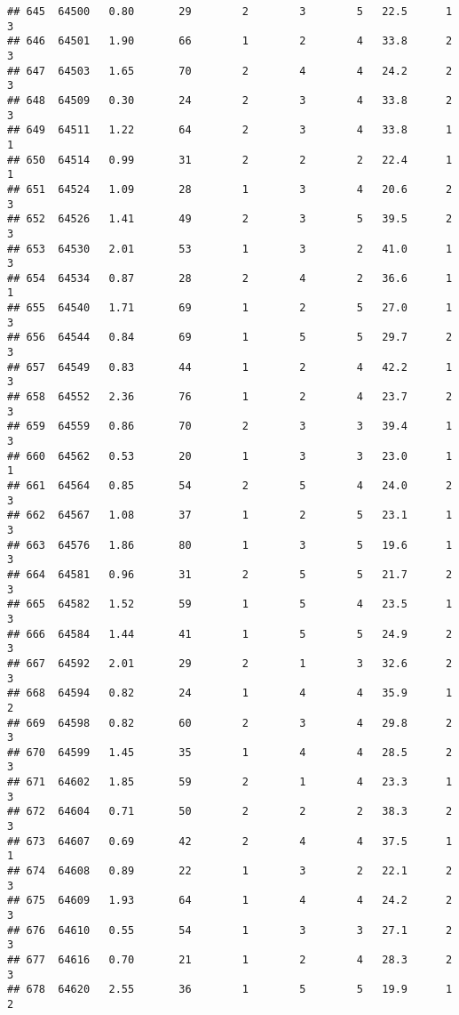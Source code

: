 \documentclass[
]{article}
\begin{document}
\begin{verbatim}
## 645  64500   0.80       29        2        3        5   22.5      1      3
## 646  64501   1.90       66        1        2        4   33.8      2      3
## 647  64503   1.65       70        2        4        4   24.2      2      3
## 648  64509   0.30       24        2        3        4   33.8      2      3
## 649  64511   1.22       64        2        3        4   33.8      1      1
## 650  64514   0.99       31        2        2        2   22.4      1      1
## 651  64524   1.09       28        1        3        4   20.6      2      3
## 652  64526   1.41       49        2        3        5   39.5      2      3
## 653  64530   2.01       53        1        3        2   41.0      1      3
## 654  64534   0.87       28        2        4        2   36.6      1      1
## 655  64540   1.71       69        1        2        5   27.0      1      3
## 656  64544   0.84       69        1        5        5   29.7      2      3
## 657  64549   0.83       44        1        2        4   42.2      1      3
## 658  64552   2.36       76        1        2        4   23.7      2      3
## 659  64559   0.86       70        2        3        3   39.4      1      3
## 660  64562   0.53       20        1        3        3   23.0      1      1
## 661  64564   0.85       54        2        5        4   24.0      2      3
## 662  64567   1.08       37        1        2        5   23.1      1      3
## 663  64576   1.86       80        1        3        5   19.6      1      3
## 664  64581   0.96       31        2        5        5   21.7      2      3
## 665  64582   1.52       59        1        5        4   23.5      1      3
## 666  64584   1.44       41        1        5        5   24.9      2      3
## 667  64592   2.01       29        2        1        3   32.6      2      3
## 668  64594   0.82       24        1        4        4   35.9      1      2
## 669  64598   0.82       60        2        3        4   29.8      2      3
## 670  64599   1.45       35        1        4        4   28.5      2      3
## 671  64602   1.85       59        2        1        4   23.3      1      3
## 672  64604   0.71       50        2        2        2   38.3      2      3
## 673  64607   0.69       42        2        4        4   37.5      1      1
## 674  64608   0.89       22        1        3        2   22.1      2      3
## 675  64609   1.93       64        1        4        4   24.2      2      3
## 676  64610   0.55       54        1        3        3   27.1      2      3
## 677  64616   0.70       21        1        2        4   28.3      2      3
## 678  64620   2.55       36        1        5        5   19.9      1      2

\end{verbatim}
\end{document}
